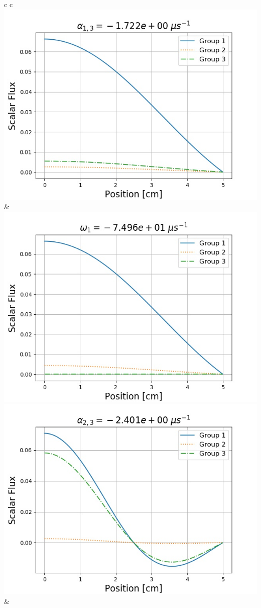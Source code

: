\documentclass{style/nseJournal}
\begin{document}
	\begin{array}{c c}
		\includegraphics[scale=0.5]{figures/NSE19-11Fig08a.jpg} &
		\includegraphics[scale=0.5]{figures/NSE19-11Fig08b.jpg} \\
		\includegraphics[scale=0.5]{figures/NSE19-11Fig08c.jpg} &

\end{array}
\end{document}
